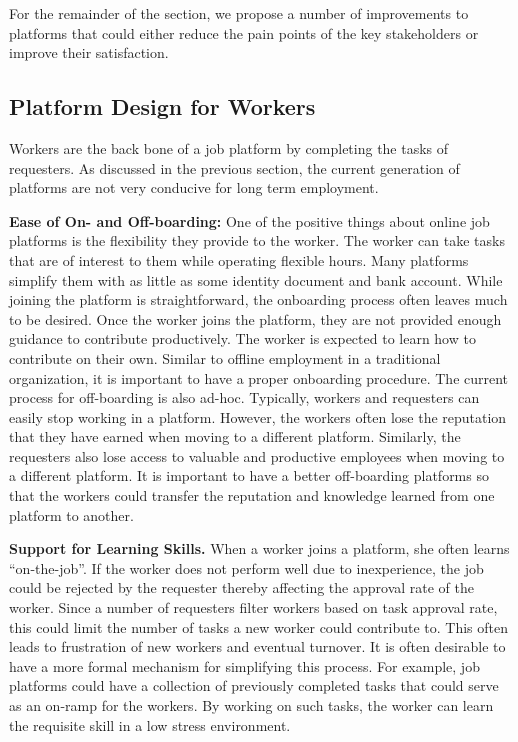 For the remainder of the section, we propose a number of improvements to platforms
that could either reduce the pain points of the key stakeholders or improve their satisfaction.

\subsection{Platform Design for Workers}
Workers are the back bone of a job platform by completing the tasks of requesters.
As discussed in the previous section, the current generation of platforms are not very conducive for
long term employment.

\textbf{Ease of On- and Off-boarding:}
One of the positive things about online job platforms is the flexibility they provide to the worker.
The worker can take tasks that are of interest to them while operating flexible hours.
Many platforms simplify them with as little as some identity document and bank account.
While joining the platform is straightforward, the onboarding process often leaves much to be desired.
Once the worker joins the platform, they are not provided enough guidance to contribute productively.
The worker is expected to learn how to contribute on their own.
Similar to offline employment in a traditional organization, it is important to have a proper onboarding procedure.
The current process for off-boarding is also ad-hoc.
Typically, workers and requesters can easily stop working in a platform.
However, the workers often lose the reputation that they have earned when moving to a different platform.
Similarly, the requesters also lose access to valuable and productive employees when moving to a different platform.
It is important to have a better off-boarding platforms so that the workers could transfer the reputation and knowledge learned from one platform to another.

\textbf{Support for Learning Skills.}
When a worker joins a platform, she often learns ``on-the-job''.
If the worker does not perform well due to inexperience, the job could be rejected by the requester
thereby affecting the approval rate of the worker.
Since a number of requesters filter workers based on task approval rate,
this could limit the number of tasks a new worker could contribute to.
This often leads to frustration of new workers and eventual turnover.
It is often desirable to have a more formal mechanism for simplifying this process.
For example, job platforms could have a collection of previously completed tasks
that could serve as an on-ramp for the workers.
By working on such tasks, the worker can learn the requisite skill in a low stress environment.


